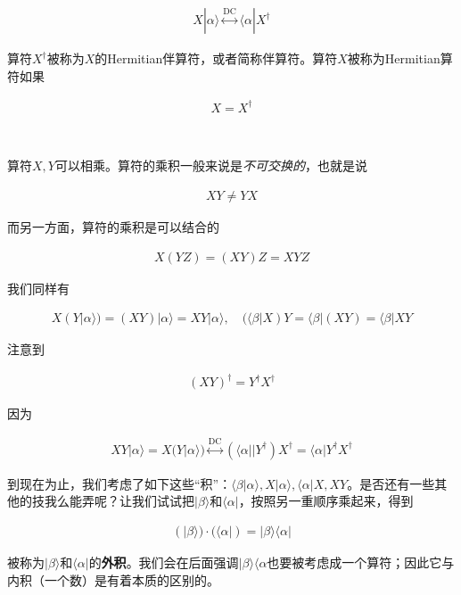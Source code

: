 \documentclass[UTF8,twoside]{ctexart}
\begin{document}
\begin{align}\label{1.2.24}
X|\alpha\rangle\overset{\text{DC}}{\longleftrightarrow}\langle\alpha|X^\dagger
\end{align}

\noindent 算符$X^\dagger$被称为$X$的Hermitian伴算符，或者简称伴算符。算符$X$被称为Hermitian算符如果

\begin{align}
X=X^\dagger
\end{align}

\ 


\noindent 算符$X, Y$可以相乘。算符的乘积一般来说是{\emph{不可交换的}}，也就是说

\begin{align}
XY\neq YX
\end{align}

\noindent 而另一方面，算符的乘积是可以结合的

\begin{align}\label{1.2.27}
X(YZ)=(XY)Z=XYZ
\end{align}

\noindent 我们同样有

\begin{align}
X(Y|\alpha\rangle) = (XY)|\alpha\rangle = XY|\alpha\rangle,\quad (\langle\beta|X)Y=\langle\beta|(XY)=\langle\beta|XY
\end{align}

\noindent 注意到

\begin{align}
(XY)^\dagger=Y^\dagger X^\dagger
\end{align}

\noindent 因为

\begin{align}
XY|\alpha\rangle = X(Y|\alpha\rangle)\overset{\text{DC}}{\longleftrightarrow}(\langle\alpha||Y^\dagger)X^\dagger = \langle\alpha|Y^\dagger X^\dagger
\end{align}

到现在为止，我们考虑了如下这些``积''：$\langle\beta|\alpha\rangle,X|\alpha\rangle,\langle\alpha|X,XY$。是否还有一些其他的技我么能弄呢？让我们试试把$|\beta\rangle$和$\langle\alpha|$，按照另一重顺序乘起来，得到

\begin{align}
(|\beta\rangle)\cdot(\langle\alpha|)=|\beta\rangle\langle\alpha|
\end{align}

\noindent 被称为$|\beta\rangle$和$\langle\alpha|$的{\bf 外积}。我们会在后面强调$|\beta\rangle\langle\alpha$也要被考虑成一个算符；因此它与内积（一个数）是有着本质的区别的。
\end{document}
